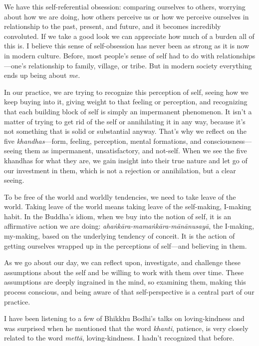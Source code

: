 We have this self-referential obsession: comparing ourselves to others, 
worrying about how we are doing, how others perceive us or how we 
perceive ourselves in relationship to the past, present, and future, 
and it becomes incredibly convoluted. If we take a good look we can 
appreciate how much of a burden all of this is. I believe this sense of 
self-obsession has never been as strong as it is now in modern culture. 
Before, most people's sense of self had to do with 
relationships---one's relationship to family, village, or tribe. But in 
modern society everything ends up being about \emph{me.}

In our practice, we are trying to recognize this perception of self, 
seeing how we keep buying into it, giving weight to that feeling or 
perception, and recognizing that each building block of self is simply 
an impermanent phenomenon. It isn't a matter of trying to get rid of 
the self or annihilating it in any way, because it's not something that 
is solid or substantial anyway. That's why we reflect on the five 
\emph{khandhas}---form, feeling, perception, mental formations, and 
consciousness---seeing them as impermanent, unsatisfactory, and 
not-self. When we see the five khandhas for what they are, we gain 
insight into their true nature and let go of our investment in them, 
which is not a rejection or annihilation, but a clear seeing.

To be free of the world and worldly tendencies, we need to take leave 
of the world. Taking leave of the world means taking leave of the 
self-making, I-making habit. In the Buddha's idiom, when we buy into 
the notion of self, it is an affirmative action we are doing: 
\emph{ahaṅkāra-mamaṅkāra-mānānusayā}, the I-making, my-making, 
based on the underlying tendency of conceit. It is the action of 
getting ourselves wrapped up in the perceptions of self---and believing 
in them.

As we go about our day, we can reflect upon, investigate, and challenge 
these assumptions about the self and be willing to work with them over 
time. These assumptions are deeply ingrained in the mind, so examining 
them, making this process conscious, and being aware of that 
self-perspective is a central part of our practice.


I have been listening to a few of Bhikkhu Bodhi's talks on 
loving-kindness and was surprised when he mentioned that the word 
\emph{khanti}, patience, is very closely related to the word 
\emph{mettā}, loving-kindness. I hadn't recognized that before.

